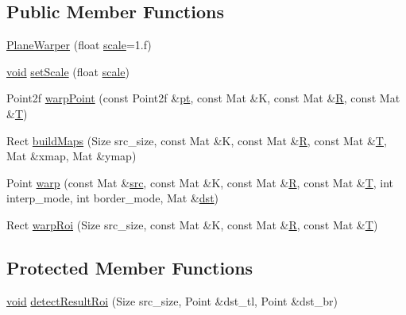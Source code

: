 \subsection*{Public Member Functions}
\begin{DoxyCompactItemize}
\item 
\hyperlink{classcv_1_1detail_1_1PlaneWarper_aa2ad12b1558467a7efd9763210067726}{Plane\-Warper} (float \hyperlink{objdetect_8hpp_a1f622eb9b9e06b30862ca90cdf2c078b}{scale}=1.f)
\item 
\hyperlink{legacy_8hpp_a8bb47f092d473522721002c86c13b94e}{void} \hyperlink{classcv_1_1detail_1_1PlaneWarper_a82ddac5630472d8645bc57c74c1061f6}{set\-Scale} (float \hyperlink{objdetect_8hpp_a1f622eb9b9e06b30862ca90cdf2c078b}{scale})
\item 
Point2f \hyperlink{classcv_1_1detail_1_1PlaneWarper_a6726f77dc2f0929289719ff6c90ba8c8}{warp\-Point} (const Point2f \&\hyperlink{objdetect_8hpp_a69c6090aa56793ec8ef2457bc6d45b45}{pt}, const Mat \&K, const Mat \&\hyperlink{imgproc__c_8h_a51837f120208319f026dc8c4a71e56e0}{R}, const Mat \&\hyperlink{calib3d_8hpp_a3efb9551a871ddd0463079a808916717}{T})
\item 
Rect \hyperlink{classcv_1_1detail_1_1PlaneWarper_a487cc124d4f4e482fa8a5ec5a2eeecbb}{build\-Maps} (Size src\-\_\-size, const Mat \&K, const Mat \&\hyperlink{imgproc__c_8h_a51837f120208319f026dc8c4a71e56e0}{R}, const Mat \&\hyperlink{calib3d_8hpp_a3efb9551a871ddd0463079a808916717}{T}, Mat \&xmap, Mat \&ymap)
\item 
Point \hyperlink{classcv_1_1detail_1_1PlaneWarper_a1d87f7472b0239599b652ed079b2a6bd}{warp} (const Mat \&\hyperlink{legacy_8hpp_a371cd109b74033bc4366f584edd3dacc}{src}, const Mat \&K, const Mat \&\hyperlink{imgproc__c_8h_a51837f120208319f026dc8c4a71e56e0}{R}, const Mat \&\hyperlink{calib3d_8hpp_a3efb9551a871ddd0463079a808916717}{T}, int interp\-\_\-mode, int border\-\_\-mode, Mat \&\hyperlink{photo__c_8h_aed13e2a25279b24dc954073233fef7a5}{dst})
\item 
Rect \hyperlink{classcv_1_1detail_1_1PlaneWarper_ad86ba550c0c6b53a21e03f46451d3945}{warp\-Roi} (Size src\-\_\-size, const Mat \&K, const Mat \&\hyperlink{imgproc__c_8h_a51837f120208319f026dc8c4a71e56e0}{R}, const Mat \&\hyperlink{calib3d_8hpp_a3efb9551a871ddd0463079a808916717}{T})
\end{DoxyCompactItemize}
\subsection*{Protected Member Functions}
\begin{DoxyCompactItemize}
\item 
\hyperlink{legacy_8hpp_a8bb47f092d473522721002c86c13b94e}{void} \hyperlink{classcv_1_1detail_1_1PlaneWarper_a79ea75cda359ffa5ac5ef16bc4d7ab63}{detect\-Result\-Roi} (Size src\-\_\-size, Point \&dst\-\_\-tl, Point \&dst\-\_\-br)
\end{DoxyCompactItemize}
